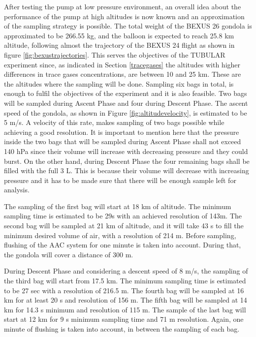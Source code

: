 \documentclass[a4paper,12pt,oneside]{article}
\begin{document}
\begin{appendices}
After testing the pump at low pressure environment, an overall idea about the performance of the pump at high altitudes is now known and an approximation of the sampling strategy is possible.   
The total weight of the BEXUS 26 gondola is approximated to be 266.55 kg, and the balloon is expected to reach 25.8 km altitude, following almost the trajectory of the BEXUS 24 flight as shown in figure \ref{fig:bexustrajectories}. 
This serves the objectives of the TUBULAR experiment since, as indicated in Section \ref{tracegases} the altitudes with higher differences in trace gases concentrations, are between 10 and 25 km. These are the altitudes where the sampling will be done. Sampling six bags in total, is enough to fulfil the objectives of the experiment and it is also feasible. Two bags will be sampled during Ascent Phase and four during Descent Phase. The ascent speed of the gondola, as shown in Figure \ref{fig:altitudevelocity}, is estimated to be 5 m/s. A velocity of this rate, makes sampling of two bags possible while achieving a good resolution. It is important to mention here that the pressure inside the two bags that will be sampled during Ascent Phase shall not exceed 140 hPa since their volume will increase with decreasing pressure and they could burst. On the other hand, during Descent Phase the four remaining bags shall be filled with the full 3 L. This is because their volume will decrease with increasing pressure and it has to be made sure that there will be enough sample left for analysis. 

The sampling of the first bag will start at 18 km of altitude. The minimum sampling time is estimated to be 29s with an achieved resolution of 143m. The second bag will be sampled at 21 km of altitude, and it will take 43 s to fill the minimum desired volume of air, with a resolution of 214 m. Before sampling, flushing of the AAC system for one minute is taken into account. During that, the gondola will cover a distance of 300 m. 

During Descent Phase and considering a descent speed of 8 m/s, the sampling of the third bag will start from 17.5 km. The minimum sampling time is estimated to be 27 sec with a resolution of 216.5 m. The fourth bag will be sampled at 16 km for at least 20 s and resolution of 156 m. The fifth bag will be sampled at 14 km for 14.3 s minimum and resolution of 115 m. The sample of the last bag will start at 12 km for 9 s minimum sampling time and 71 m resolution. Again, one minute of flushing is taken into account, in between the sampling of each bag.


\end{appendices}
\end{document}
